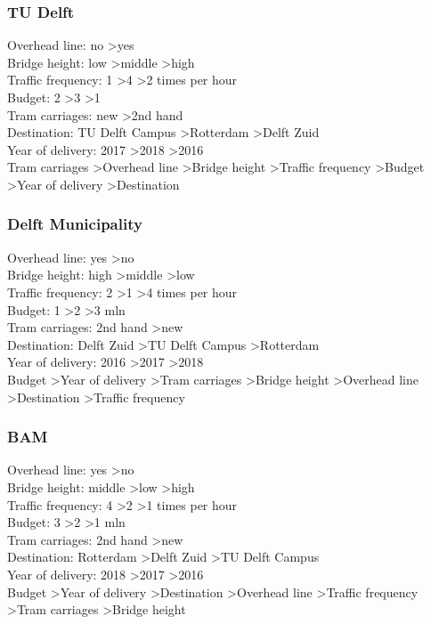 \documentclass{article}
\begin{document}
\subsubsection{TU Delft}
Overhead line: no \textgreater yes \\
Bridge height: low \textgreater middle \textgreater high \\
Traffic frequency: 1 \textgreater 4 \textgreater 2 times per hour \\
Budget: 2 \textgreater 3 \textgreater 1 \\
Tram carriages: new \textgreater 2nd hand \\
Destination: TU Delft Campus \textgreater Rotterdam \textgreater Delft Zuid \\
Year of delivery: 2017 \textgreater 2018 \textgreater 2016 \\

Tram carriages \textgreater Overhead line \textgreater Bridge height \textgreater Traffic frequency \textgreater Budget \textgreater Year of delivery \textgreater Destination\\


\subsubsection{Delft Municipality}
Overhead line: yes \textgreater no \\
Bridge height: high \textgreater middle \textgreater low \\
Traffic frequency: 2 \textgreater 1 \textgreater 4 times per hour \\
Budget: 1 \textgreater 2 \textgreater 3 mln \\
Tram carriages: 2nd hand \textgreater new \\
Destination: Delft Zuid \textgreater TU Delft Campus \textgreater Rotterdam \\
Year of delivery: 2016 \textgreater 2017 \textgreater 2018 \\

Budget \textgreater Year of delivery \textgreater Tram carriages \textgreater Bridge height \textgreater Overhead line \textgreater Destination \textgreater Traffic frequency\\


\subsubsection{BAM}
Overhead line: yes \textgreater no \\
Bridge height: middle \textgreater low \textgreater high \\
Traffic frequency: 4 \textgreater 2 \textgreater 1 times per hour \\
Budget: 3 \textgreater 2 \textgreater 1 mln \\
Tram carriages: 2nd hand \textgreater new \\
Destination: Rotterdam \textgreater Delft Zuid \textgreater TU Delft Campus \\
Year of delivery: 2018 \textgreater 2017 \textgreater 2016 \\

Budget \textgreater Year of delivery \textgreater Destination \textgreater Overhead line \textgreater Traffic frequency \textgreater Tram carriages \textgreater Bridge height\\
\end{document}
